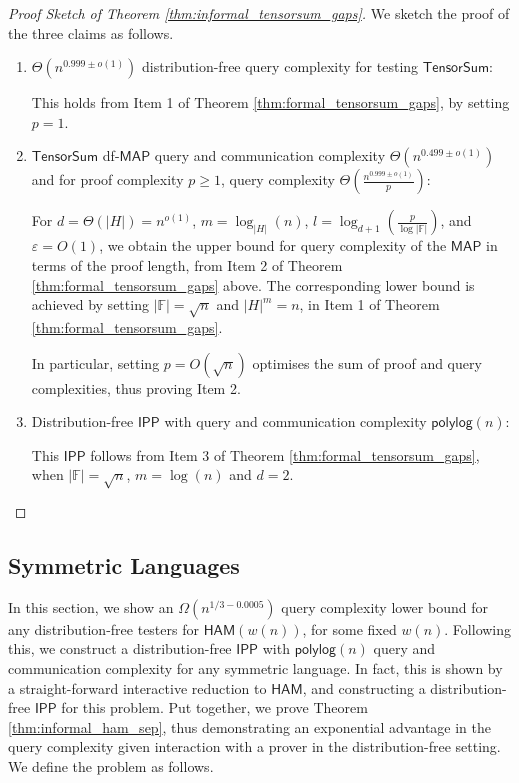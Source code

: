 \documentclass[11pt]{article}
\newcommand{\polylog}{\mathsf{polylog}}
\newcommand{\HAM}{\mathsf{HAM}}
\newcommand{\IPP}{\mathsf{IPP}}
\newcommand{\MAP}{\mathsf{MAP}}
\newcommand{\TensorSum}{\mathsf{TensorSum}}
\begin{document}
\begin{proof}[Proof Sketch of Theorem \ref{thm:informal_tensorsum_gaps}]
We sketch the proof of the three claims as follows.
\begin{enumerate}
    \item $\Theta(n^{0.999\pm o(1)})$ distribution-free query complexity for testing $\TensorSum$:
    
    This holds from Item 1 of Theorem \ref{thm:formal_tensorsum_gaps}, by setting $p = 1$.
    
    \item $\TensorSum$ df-$\MAP$ query and communication complexity $\Theta(n^{0.499\pm o(1)})$ and for proof complexity $p\geq 1$, query complexity $\Theta(\frac{n^{0.999\pm o(1)}}{p})$:
    
    For $d=\Theta(\vert H \vert)=n^{o(1)}$, $m=\log_{|H|}(n)$, $l=\log_{d+1}(\frac{p}{\log |\mathbb{F}|})$, and $\varepsilon=O(1)$, we obtain the upper bound for query complexity of the $\MAP$ in terms of the proof length, from Item 2 of Theorem \ref{thm:formal_tensorsum_gaps} above. The corresponding lower bound is achieved by setting $|\mathbb{F}|=\sqrt{n}$ and $|H|^{m}=n$, in Item 1 of Theorem \ref{thm:formal_tensorsum_gaps}. 

    In particular, setting $p = O(\sqrt{n})$ optimises the sum of proof and query complexities, thus proving Item 2.
    
    \item Distribution-free $\IPP$ with query and communication complexity $\polylog(n)$:
    
    This $\IPP$ follows from Item 3 of Theorem \ref{thm:formal_tensorsum_gaps}, when $|\mathbb{F}|=\sqrt{n}$, $m=\log(n)$ and $d=2$.
\end{enumerate}    
\end{proof}

\subsection{Symmetric Languages}
\label{sec:sym}



In this section, we show an $\Omega(n^{1/3-0.0005})$ query complexity lower bound for any distribution-free testers for $\HAM(w(n))$, for some fixed $w(n)$. Following this, we construct a distribution-free $\IPP$ with $\polylog(n)$ query and communication complexity for any symmetric language. In fact, this is shown by a straight-forward interactive reduction to $\HAM$, and constructing a distribution-free $\IPP$ for this problem. Put together, we prove Theorem \ref{thm:informal_ham_sep}, thus demonstrating an exponential advantage in the query complexity given interaction with a prover in the distribution-free setting. We define the problem as follows.
\end{document}
